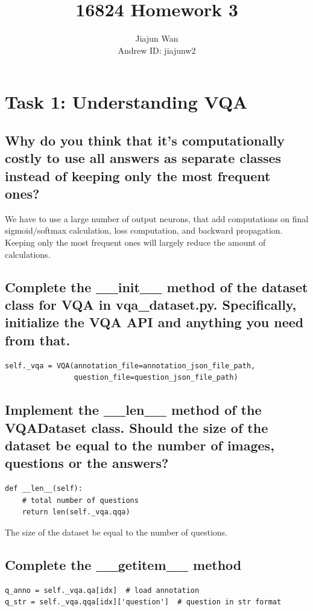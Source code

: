 \documentclass{article}
\title{16824 Homework 3}
\author{Jiajun Wan \\ Andrew ID: jiajunw2}
\date{}
\begin{document}
\maketitle

\setcounter{section}{1}
\section*{Task 1: Understanding VQA}

\setcounter{subsection}{0}
\subsection{Why do you think that it's computationally costly to use all answers as separate classes instead of keeping only the most frequent ones?}
We have to use a large number of output neurons, that add computations on final sigmoid/softmax calculation, loss computation, and backward propagation. Keeping only the most frequent ones will largely reduce the amount of calculations.

\subsection{Complete the \_\_init\_\_ method of the dataset class for VQA in vqa\_dataset.py. Specifically, initialize the VQA API and anything you need from that.}
\begin{lstlisting}
self._vqa = VQA(annotation_file=annotation_json_file_path,
                question_file=question_json_file_path)
\end{lstlisting}

\subsection{Implement the \_\_len\_\_ method of the VQADataset class. Should the size of the dataset be equal to the number of images, questions or the answers?}
\begin{lstlisting}
def __len__(self):
    # total number of questions
    return len(self._vqa.qqa)
\end{lstlisting}
The size of the dataset be equal to the number of questions.

\subsection{Complete the \_\_getitem\_\_ method}
\begin{lstlisting}
q_anno = self._vqa.qa[idx]  # load annotation
q_str = self._vqa.qqa[idx]['question']  # question in str format
\end{lstlisting}
\newpage
\end{document}

